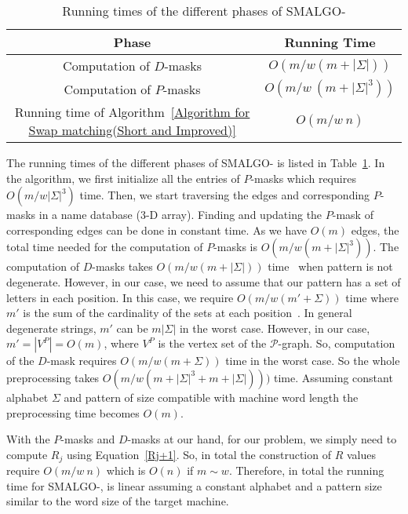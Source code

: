 \documentclass{llncs}
\newcommand{\rom}[1]{\uppercase\expandafter{\romannumeral #1\relax}}
\begin{document}
{\begin{table}
\begin{center}
\begin{tabular}{|c|c|}
\hline
Phase&Running Time\\
\hline
Computation of $D$-masks&$O(m/w(m + |\Sigma|))$\\
\hline
Computation of $P$-masks&$O(m/w~(m + {\vert\Sigma\vert}^{3}))$\\
\hline
Running time of Algorithm~\ref{Algorithm for Swap matching(Short and Improved)}&$O(m/w ~n)$\\
\hline
\end{tabular}
\caption{Running times of the different phases of SMALGO-\rom{1}}
\label{Table_RunningTime1}
\end{center}
\end{table}


The running times of the different phases of SMALGO-\rom{1} is listed in Table~\ref{Table_RunningTime1}. In the algorithm, we first initialize all the entries of $P$-masks which requires $O(m/w {\vert\Sigma\vert}^{3})$ time. Then, we start traversing the edges and corresponding $P$-masks in a name database ($3$-D array). Finding and updating the $P$-mask of corresponding edges can be done in constant time. As we have $O(m)$ edges, the total time needed for the computation of $P$-masks is $O(m/w (m + {\vert\Sigma\vert}^{3}))$. 
The computation of $D$-masks takes $O(m/w (m + {\vert\Sigma\vert}))$ time~\cite{BG92} when pattern is not degenerate. However, in our case, we need to assume that our pattern has a set of letters in each position. In this case, we require $O(m/w(m'+\Sigma))$ time where $m'$ is the sum of the cardinality of the sets at each position~\cite{BG92}. In general degenerate strings, $m'$ can be $m|\Sigma|$ in the worst case. However, in our case, $m' = |V^P| = O(m)$, where $V^P$ is the vertex set of the $\mathcal P$-graph. So, computation of the $D$-mask requires $O(m/w(m+\Sigma))$ time in the worst case. So the whole preprocessing takes $O(m/w (m + {\vert\Sigma\vert}^{3} + m + {\vert\Sigma\vert})))$ time. Assuming constant alphabet $\Sigma$ and pattern of size compatible with machine word length the preprocessing time becomes $O(m)$.


With the $P$-masks and $D$-masks at our hand, for our problem, we simply need to compute $R_{j}$ using Equation~\ref{Rj+1}. So, in total the construction of $R$ values require $O(m/w ~n)$ which is $O(n)$ if $m \sim w$. Therefore, in total the running time for SMALGO-\rom{1}, is linear 
assuming a constant alphabet and a pattern size similar to the word size of the target machine.
















}
\end{document}
